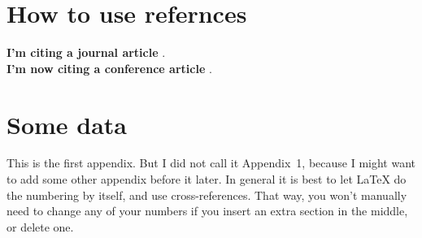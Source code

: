\documentclass{article}
\begin{document}
\section{How to use refernces}
\lipsum[1]
\textbf{I'm citing a journal article} \cite{GaborHolography}.\\
\lipsum[2]
\textbf{I'm now citing a conference article} \cite{HardReview_84}.



\cleardoublepage


\cleardoublepage
\appendix
\section{Some data}
This is the first appendix.  But I did not call
it Appendix~1, because I might want to add some
other appendix before it later.  In general it is
best to let \LaTeX{} do the numbering by itself,
and use cross-references.  That way, you won't
manually need to change any of your numbers if
you insert an extra section in the middle, or
delete one.

\lipsum[1]
\end{document}
